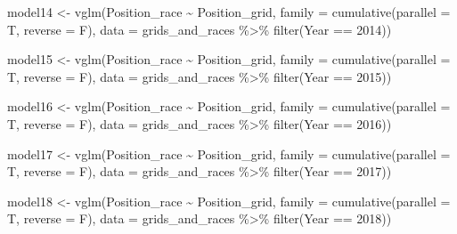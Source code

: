 \documentclass[
]{book}
\newenvironment{Shaded}{\begin{snugshade}}{\end{snugshade}}
\newcommand{\AttributeTok}[1]{\textcolor[rgb]{0.77,0.63,0.00}{#1}}
\newcommand{\DecValTok}[1]{\textcolor[rgb]{0.00,0.00,0.81}{#1}}
\newcommand{\FunctionTok}[1]{\textcolor[rgb]{0.00,0.00,0.00}{#1}}
\newcommand{\NormalTok}[1]{#1}
\newcommand{\OtherTok}[1]{\textcolor[rgb]{0.56,0.35,0.01}{#1}}
\newcommand{\SpecialCharTok}[1]{\textcolor[rgb]{0.00,0.00,0.00}{#1}}
\begin{document}
\begin{Shaded}
\begin{Highlighting}[]
\NormalTok{model14 }\OtherTok{\textless{}{-}} \FunctionTok{vglm}\NormalTok{(Position\_race }\SpecialCharTok{\textasciitilde{}}\NormalTok{ Position\_grid, }
                      \AttributeTok{family =} \FunctionTok{cumulative}\NormalTok{(}\AttributeTok{parallel =}\NormalTok{ T, }\AttributeTok{reverse =}\NormalTok{ F),}
                      \AttributeTok{data =}\NormalTok{ grids\_and\_races }\SpecialCharTok{\%\textgreater{}\%}
                       \FunctionTok{filter}\NormalTok{(Year }\SpecialCharTok{==} \DecValTok{2014}\NormalTok{))}

\NormalTok{model15 }\OtherTok{\textless{}{-}} \FunctionTok{vglm}\NormalTok{(Position\_race }\SpecialCharTok{\textasciitilde{}}\NormalTok{ Position\_grid, }
                      \AttributeTok{family =} \FunctionTok{cumulative}\NormalTok{(}\AttributeTok{parallel =}\NormalTok{ T, }\AttributeTok{reverse =}\NormalTok{ F),}
                      \AttributeTok{data =}\NormalTok{ grids\_and\_races }\SpecialCharTok{\%\textgreater{}\%}
                       \FunctionTok{filter}\NormalTok{(Year }\SpecialCharTok{==} \DecValTok{2015}\NormalTok{))}

\NormalTok{model16 }\OtherTok{\textless{}{-}} \FunctionTok{vglm}\NormalTok{(Position\_race }\SpecialCharTok{\textasciitilde{}}\NormalTok{ Position\_grid, }
                      \AttributeTok{family =} \FunctionTok{cumulative}\NormalTok{(}\AttributeTok{parallel =}\NormalTok{ T, }\AttributeTok{reverse =}\NormalTok{ F),}
                      \AttributeTok{data =}\NormalTok{ grids\_and\_races }\SpecialCharTok{\%\textgreater{}\%}
                       \FunctionTok{filter}\NormalTok{(Year }\SpecialCharTok{==} \DecValTok{2016}\NormalTok{))}

\NormalTok{model17 }\OtherTok{\textless{}{-}} \FunctionTok{vglm}\NormalTok{(Position\_race }\SpecialCharTok{\textasciitilde{}}\NormalTok{ Position\_grid, }
                      \AttributeTok{family =} \FunctionTok{cumulative}\NormalTok{(}\AttributeTok{parallel =}\NormalTok{ T, }\AttributeTok{reverse =}\NormalTok{ F),}
                      \AttributeTok{data =}\NormalTok{ grids\_and\_races }\SpecialCharTok{\%\textgreater{}\%}
                       \FunctionTok{filter}\NormalTok{(Year }\SpecialCharTok{==} \DecValTok{2017}\NormalTok{))}

\NormalTok{model18 }\OtherTok{\textless{}{-}} \FunctionTok{vglm}\NormalTok{(Position\_race }\SpecialCharTok{\textasciitilde{}}\NormalTok{ Position\_grid, }
                      \AttributeTok{family =} \FunctionTok{cumulative}\NormalTok{(}\AttributeTok{parallel =}\NormalTok{ T, }\AttributeTok{reverse =}\NormalTok{ F),}
                      \AttributeTok{data =}\NormalTok{ grids\_and\_races }\SpecialCharTok{\%\textgreater{}\%}
                       \FunctionTok{filter}\NormalTok{(Year }\SpecialCharTok{==} \DecValTok{2018}\NormalTok{))}


\end{Highlighting}
\end{Shaded}
\end{document}
